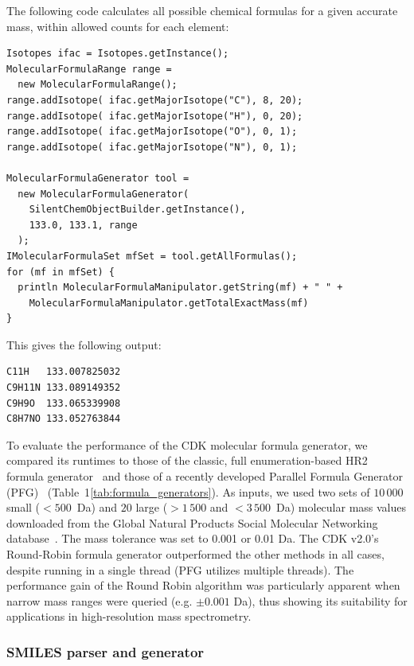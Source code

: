 \documentclass[doublespacing]{bmcart}
\def \cdkversion {v2.0}
\begin{document}
The following code calculates all possible chemical formulas for a given
accurate mass, within allowed counts for each element:

\vspace{0.2cm}
\begin{verbatim}
Isotopes ifac = Isotopes.getInstance();
MolecularFormulaRange range =
  new MolecularFormulaRange();
range.addIsotope( ifac.getMajorIsotope("C"), 8, 20);
range.addIsotope( ifac.getMajorIsotope("H"), 0, 20);
range.addIsotope( ifac.getMajorIsotope("O"), 0, 1);
range.addIsotope( ifac.getMajorIsotope("N"), 0, 1);

MolecularFormulaGenerator tool =
  new MolecularFormulaGenerator(
    SilentChemObjectBuilder.getInstance(),
    133.0, 133.1, range
  );
IMolecularFormulaSet mfSet = tool.getAllFormulas();
for (mf in mfSet) {
  println MolecularFormulaManipulator.getString(mf) + " " +
    MolecularFormulaManipulator.getTotalExactMass(mf)
}
\end{verbatim}
\vspace{0.2cm}

This gives the following output:

\vspace{0.2cm}
\begin{verbatim}
C11H   133.007825032
C9H11N 133.089149352
C9H9O  133.065339908
C8H7NO 133.052763844
\end{verbatim}
\vspace{0.2cm}

 To evaluate the performance of the CDK molecular formula generator, we
compared its runtimes to those of the classic, full enumeration-based HR2
formula generator~\cite{Kind2007} and those of a recently developed Parallel
Formula Generator (PFG)~\cite{Zhang2016} (Table~1\ref{tab:formula_generators}).
As inputs, we used two sets of $10\,000$ small ($< 500$~Da) and $20$ large ($>
1\,500$ and $< 3\,500$~Da) molecular mass values downloaded from the Global
Natural Products Social Molecular Networking database~\cite{wang2016}. The mass
tolerance was set to 0.001 or 0.01 Da. The CDK \cdkversion{}'s Round-Robin 
formula generator outperformed the other methods in all cases, despite running
in a single thread (PFG utilizes multiple threads). The performance gain of
the Round Robin algorithm was particularly apparent when narrow mass ranges 
were queried (e.g. $\pm 0.001$ Da), thus showing its suitability for
applications in high-resolution mass spectrometry.

\subsubsection*{SMILES parser and generator}
\end{document}
